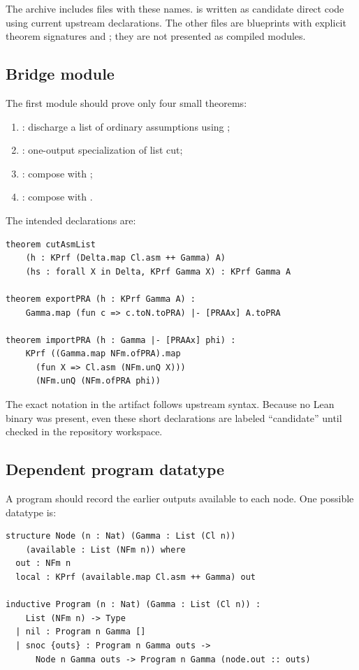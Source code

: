 The archive includes files with these names.   is written as
candidate direct code using current upstream declarations.  The other files are
blueprints with explicit theorem signatures and ; they are not
presented as compiled modules.

\subsection{Bridge module}

The first module should prove only four small theorems:

\begin{enumerate}
\item {}: discharge a list of ordinary assumptions using
;
\item {}: one-output specialization of list cut;
\item {}: compose  with
;
\item {}: compose  with
.
\end{enumerate}

The intended declarations are:

\begin{lstlisting}[language={},caption={Core proof-exchange API}]
theorem cutAsmList
    (h : KPrf (Delta.map Cl.asm ++ Gamma) A)
    (hs : forall X in Delta, KPrf Gamma X) : KPrf Gamma A

theorem exportPRA (h : KPrf Gamma A) :
    Gamma.map (fun c => c.toN.toPRA) |- [PRAAx] A.toPRA

theorem importPRA (h : Gamma |- [PRAAx] phi) :
    KPrf ((Gamma.map NFm.ofPRA).map
      (fun X => Cl.asm (NFm.unQ X)))
      (NFm.unQ (NFm.ofPRA phi))
\end{lstlisting}

The exact notation in the artifact follows upstream syntax.  Because no Lean
binary was present, even these short declarations are labeled ``candidate''
until checked in the repository workspace.

\subsection{Dependent program datatype}

A program should record the earlier outputs available to each node.
One possible datatype is:

\begin{lstlisting}[language={},caption={Suggested dependent schedule}]
structure Node (n : Nat) (Gamma : List (Cl n))
    (available : List (NFm n)) where
  out : NFm n
  local : KPrf (available.map Cl.asm ++ Gamma) out

inductive Program (n : Nat) (Gamma : List (Cl n)) :
    List (NFm n) -> Type
  | nil : Program n Gamma []
  | snoc {outs} : Program n Gamma outs ->
      Node n Gamma outs -> Program n Gamma (node.out :: outs)
\end{lstlisting}

